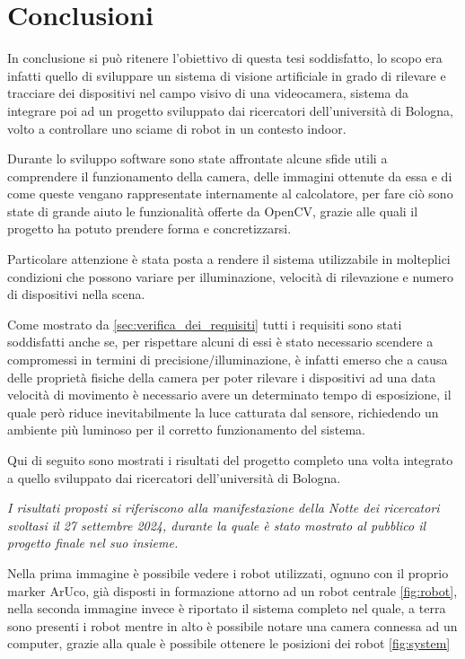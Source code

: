 \documentclass[12pt,a4paper,openright,twoside]{book}
\begin{document}
\chapter{Conclusioni}
In conclusione si può ritenere l'obiettivo di questa tesi soddisfatto, lo scopo era infatti quello di sviluppare un sistema di visione artificiale in grado di rilevare e tracciare dei dispositivi nel campo visivo di una videocamera, sistema da integrare poi ad un progetto sviluppato dai ricercatori dell'università di Bologna, volto a controllare uno sciame di robot in un contesto indoor.

Durante lo sviluppo software sono state affrontate alcune sfide utili a comprendere il funzionamento della camera, delle immagini ottenute da essa e di come queste vengano rappresentate internamente al calcolatore, per fare ciò sono state di grande aiuto le funzionalità offerte da OpenCV, grazie alle quali il progetto ha potuto prendere forma e concretizzarsi.

Particolare attenzione è stata posta a rendere il sistema utilizzabile in molteplici condizioni che possono variare per illuminazione, velocità di rilevazione e numero di dispositivi nella scena.

Come mostrato da \ref{sec:verifica_dei_requisiti} tutti i requisiti sono stati soddisfatti anche se, per rispettare alcuni di essi è stato necessario scendere a compromessi in termini di precisione/illuminazione, è infatti emerso che a causa delle proprietà fisiche della camera per poter rilevare i dispositivi ad una data velocità di movimento è necessario avere un determinato tempo di esposizione, il quale però riduce inevitabilmente la luce catturata dal sensore, richiedendo un ambiente più luminoso per il corretto funzionamento del sistema.

Qui di seguito sono mostrati i risultati del progetto completo una volta integrato a quello sviluppato dai ricercatori dell'università di Bologna.

\vspace{0.5cm}
\textit{I risultati proposti si riferiscono alla manifestazione della Notte dei ricercatori svoltasi il 27 settembre 2024, durante la quale è stato mostrato al pubblico il progetto finale nel suo insieme.}
\vspace{0.5cm}

Nella prima immagine è possibile vedere i robot utilizzati, ognuno con il proprio marker ArUco, già disposti in formazione attorno ad un robot centrale \ref{fig:robot}, nella seconda immagine invece è riportato il sistema completo nel quale, a terra sono presenti i robot mentre in alto è possibile notare una camera connessa ad un computer, grazie alla quale è possibile ottenere le posizioni dei robot \ref{fig:system}
\end{document}
